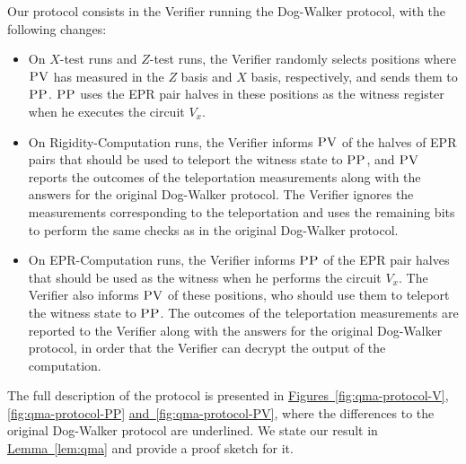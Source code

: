 \documentclass[11pt]{article}
\numberwithin{equation}{section}
\theoremstyle{definition}
\theoremstyle{plain}
\newcommand{\expref}[2]{\hyperref[#2]{#1~\ref{#2}}}
\newcommand{\pv}{\textsc{PV}}
\newcommand{\pp}{\textsc{PP}}
\begin{document}
%
%
Our protocol consists in the Verifier running the Dog-Walker protocol,
  with the following changes:
  \begin{itemize}
  \item %
        On $X$-test runs 
        and $Z$-test runs, %
the Verifier randomly selects  positions where
$\pv$ has measured in the $Z$ basis %
and $X$ basis, respectively, %
and sends them to $\pp$. $\pp$ uses the EPR pair halves in these positions as the witness register when he executes the circuit $V_x$.
    \item On Rigidity-Computation runs, the Verifier
      informs $\pv$ of the halves of EPR pairs that should be used to teleport the witness
      state to $\pp$, and $\pv$ reports the outcomes of the teleportation
      measurements along with the answers for the original Dog-Walker protocol. The Verifier ignores the measurements corresponding to the teleportation and uses the remaining bits to perform the same checks as in the original Dog-Walker protocol.
      \item On EPR-Computation runs, the Verifier informs $\pp$ of the
      EPR pair halves that should be used as the witness when he performs the circuit $V_x$.  
      The Verifier
      also informs $\pv$ of these positions, who should use them to teleport the witness
      state to $\pp$.  The outcomes of the teleportation      measurements are reported to the Verifier along with the answers for the original Dog-Walker protocol, in order that the Verifier can decrypt the output of the computation.
  \end{itemize}

The full description of the protocol is presented in \expref{Figures}{fig:qma-protocol-V}, \ref{fig:qma-protocol-PP} \expref{and}{fig:qma-protocol-PV}, where the differences to the original Dog-Walker protocol are underlined. We state our result in \expref{Lemma}{lem:qma} and provide a proof sketch for it. 
\end{document}
